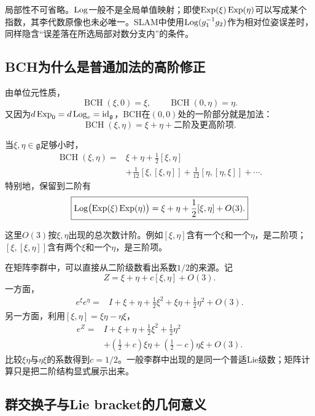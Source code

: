局部性不可省略。$\operatorname{Log}$一般不是全局单值映射；即使$\operatorname{Exp}(\xi)\operatorname{Exp}(\eta)$可以写成某个指数，其李代数原像也未必唯一。SLAM中使用$\operatorname{Log}(g_1^{-1}g_2)$作为相对位姿误差时，同样隐含“误差落在所选局部对数分支内”的条件。

\subsection{BCH为什么是普通加法的高阶修正}

由单位元性质，
\[
    \operatorname{BCH}(\xi,0)=\xi,
    \qquad
    \operatorname{BCH}(0,\eta)=\eta.
\]
又因为$d\operatorname{Exp}_0=d\operatorname{Log}_e=\operatorname{id}_{\mathfrak g}$，BCH在$(0,0)$处的一阶部分就是加法：
\[
    \operatorname{BCH}(\xi,\eta)
    =\xi+\eta+\text{二阶及更高阶项}.
\]

\begin{theorem}[BCH公式的局部展开]
当$\xi,\eta\in\mathfrak g$足够小时，
\[
\begin{aligned}
    \operatorname{BCH}(\xi,\eta)
    ={}&\xi+\eta
    +\frac12[\xi,\eta]\\
    &+\frac1{12}[\xi,[\xi,\eta]]
    +\frac1{12}[\eta,[\eta,\xi]]
    +\cdots.
\end{aligned}
\]
特别地，保留到二阶有
\[
    \boxed{
    \operatorname{Log}\bigl(\operatorname{Exp}(\xi)\operatorname{Exp}(\eta)\bigr)
    =\xi+\eta+\frac12[\xi,\eta]+O(3).
    }
\]
\end{theorem}

这里$O(3)$按$\xi,\eta$出现的总次数计阶。例如$[\xi,\eta]$含有一个$\xi$和一个$\eta$，是二阶项；$[\xi,[\xi,\eta]]$含有两个$\xi$和一个$\eta$，是三阶项。

在矩阵李群中，可以直接从二阶级数看出系数$1/2$的来源。记
\[
    Z=\xi+\eta+c[\xi,\eta]+O(3).
\]
一方面，
\[
\begin{aligned}
    e^\xi e^\eta
    ={}&I+\xi+\eta
    +\frac12\xi^2+\xi\eta+\frac12\eta^2
    +O(3).
\end{aligned}
\]
另一方面，利用$[\xi,\eta]=\xi\eta-\eta\xi$，
\[
\begin{aligned}
    e^Z
    ={}&I+\xi+\eta
    +\frac12\xi^2+\frac12\eta^2\\
    &+\left(\frac12+c\right)\xi\eta
    +\left(\frac12-c\right)\eta\xi
    +O(3).
\end{aligned}
\]
比较$\xi\eta$与$\eta\xi$的系数得到$c=1/2$。一般李群中出现的是同一个普适Lie级数；矩阵计算只是把二阶结构显式展示出来。

\subsection{群交换子与Lie bracket的几何意义}

